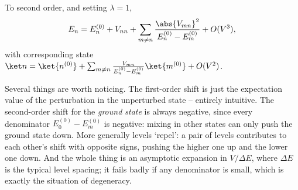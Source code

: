 \begin{theorem}
    To second order, and setting $\lambda = 1$,
    $$
    E_n = E_n^{(0)} + V_{nn} + \sum_{m \neq n} \frac{\abs{V_{mn}}^2}{E_n^{(0)}-E_m^{(0)}} + O(V^3),
    $$
    with corresponding state $\ket n = \ket{n^{(0)}} + \sum_{m\neq n}\frac{V_{mn}}{E_n^{(0)}-E_m^{(0)}}\ket{m^{(0)}} + O(V^2)$.
\end{theorem}

Several things are worth noticing. The first-order shift is just the expectation value of the perturbation in the unperturbed state -- entirely intuitive. The second-order shift for the \emph{ground state} is always negative, since every denominator $E_0^{(0)}-E_m^{(0)}$ is negative: mixing in other states can only push the ground state down. More generally levels `repel': a pair of levels contributes to each other's shift with opposite signs, pushing the higher one up and the lower one down. And the whole thing is an asymptotic expansion in $V/\Delta E$, where $\Delta E$ is the typical level spacing; it fails badly if any denominator is small, which is exactly the situation of degeneracy.

\begin{center}
\end{center}

